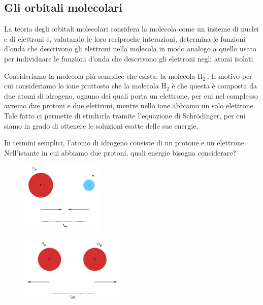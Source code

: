 \subsection{Gli orbitali molecolari}
La teoria degli orbitali molecolari considera la molecola come un insieme di nuclei e di elettroni e,
valutando le loro reciproche interazioni, determina le funzioni d’onda che descrivono gli elettroni nella
molecola in modo analogo a quello usato per individuare le funzioni d’onda che descrivono gli elettroni
negli atomi isolati.

\vspace{0.2cm}Consideriamo la molecola più semplice che esista: la molecola H$_2^+$. Il motivo per cui consideriamo lo ione piuttosto che la molecola H$_2$ è che questa è composta da due atomi di idrogeno, ognuno dei quali porta un elettrone, per cui nel complesso avremo due protoni e due elettroni, mentre nello ione abbiamo un solo elettrone. Tale fatto ci permette di studiarla tramite l'equazione di Schrödinger, per cui siamo in grado di ottenere le soluzioni esatte delle sue energie.

In termini semplici, l'atomo di idrogeno consiste di un protone e un elettrone. Nell'istante in cui abbiamo due protoni, quali energie bisogna considerare?

\hspace{1.5cm}\begin{minipage}{0.5\textwidth}
    \begin{figure}[H]
        \includegraphics[width=4cm]{immagini/attrazione protone-elettrone.png}
    \end{figure}
    \end{minipage} \hfill
    \begin{minipage}{0.5\textwidth}
    \begin{figure}[H]
        \includegraphics[width=5cm]{immagini/repulsione protone-protone.png}
    \end{figure}
    \end{minipage}

